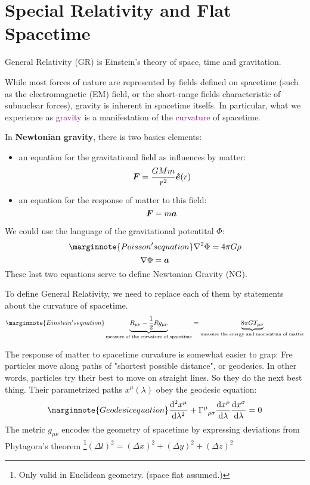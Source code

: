 \section{Special Relativity and Flat Spacetime}
General Relativity (GR) is Einstein's theory of space, time and gravitation.

While most forces of nature are represented by fields defined on spacetime (such as the electromagnetic (EM) field, or the short-range fields characteristic of subnuclear forces), gravity is inherent in spacetime itselfs. In particular, what we experience as \textcolor{purple}{gravity} is a manifestation of the \textcolor{purple}{curvature} of spacetime.

In \textbf{Newtonian gravity}, there is two basics elements:
\begin{itemize}
    \item an equation for the gravitational field as influences by matter:
    \begin{equation*}
        \vb*{F}=\frac{GMm}{r^2}\vu*{e}(r)
    \end{equation*}
    \item an equation for the response of matter to this field:
    \begin{equation}
        \vb*{F}=m\vb*{a}
    \end{equation}
\end{itemize}
We could use the language of the gravitational potentital $\Phi$:
\begin{equation}\marginnote{Poisson's equation}
    \nabla^2\Phi=4\pi G\rho
\end{equation}
\begin{equation}
    \nabla\Phi=\vb*{a}
\end{equation}
These last two equations serve to define Newtonian Gravity (NG).

To define General Relativity, we need to replace each of them by statements about the curvature of spacetime.
\begin{equation}\marginnote{Einstein's equation}
    \underbrace{R_{\mu\nu}-\frac{1}{2}Rg_{\mu\nu}}_{\text{measure of the curvature of spacetime}}= \underbrace{8\pi GT_{\mu\nu}}_{\text{measure the energy and momentum of matter}}
\end{equation}

The response of matter to spacetime curvature is somewhat easier to grap: Fre particles move along paths of "shortest possible distance", or geodesics. In other words, particles try their best to move on straight lines. So they do the next best thing. Their parametrized paths $x^\mu(\lambda)$ obey the geodesic equation:
\begin{equation}\marginnote{Geodesic equation}
    \dv[2]{x^\mu}{\lambda}+\tensor{\Gamma}{^\mu_{\rho\sigma}}\dv{x^\rho}{\lambda}\dv{x^\sigma}{\lambda}=0
\end{equation}
The metric $g_{\mu\nu}$ encodes the geometry of spacetime by expressing deviations from Phytagora's theorem \footnote{Only valid in Euclidean geometry. (space flat assumed.)}$(\Delta l)^2=(\Delta x)^2+(\Delta y)^2+(\Delta z)^2$

